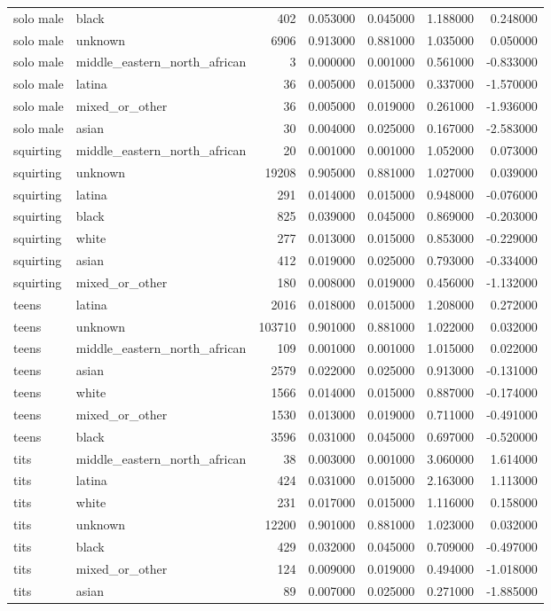 \begin{tabular}{llrrrrr}
solo male & black & 402 & 0.053000 & 0.045000 & 1.188000 & 0.248000 \\
solo male & unknown & 6906 & 0.913000 & 0.881000 & 1.035000 & 0.050000 \\
solo male & middle_eastern_north_african & 3 & 0.000000 & 0.001000 & 0.561000 & -0.833000 \\
solo male & latina & 36 & 0.005000 & 0.015000 & 0.337000 & -1.570000 \\
solo male & mixed_or_other & 36 & 0.005000 & 0.019000 & 0.261000 & -1.936000 \\
solo male & asian & 30 & 0.004000 & 0.025000 & 0.167000 & -2.583000 \\
squirting & middle_eastern_north_african & 20 & 0.001000 & 0.001000 & 1.052000 & 0.073000 \\
squirting & unknown & 19208 & 0.905000 & 0.881000 & 1.027000 & 0.039000 \\
squirting & latina & 291 & 0.014000 & 0.015000 & 0.948000 & -0.076000 \\
squirting & black & 825 & 0.039000 & 0.045000 & 0.869000 & -0.203000 \\
squirting & white & 277 & 0.013000 & 0.015000 & 0.853000 & -0.229000 \\
squirting & asian & 412 & 0.019000 & 0.025000 & 0.793000 & -0.334000 \\
squirting & mixed_or_other & 180 & 0.008000 & 0.019000 & 0.456000 & -1.132000 \\
teens & latina & 2016 & 0.018000 & 0.015000 & 1.208000 & 0.272000 \\
teens & unknown & 103710 & 0.901000 & 0.881000 & 1.022000 & 0.032000 \\
teens & middle_eastern_north_african & 109 & 0.001000 & 0.001000 & 1.015000 & 0.022000 \\
teens & asian & 2579 & 0.022000 & 0.025000 & 0.913000 & -0.131000 \\
teens & white & 1566 & 0.014000 & 0.015000 & 0.887000 & -0.174000 \\
teens & mixed_or_other & 1530 & 0.013000 & 0.019000 & 0.711000 & -0.491000 \\
teens & black & 3596 & 0.031000 & 0.045000 & 0.697000 & -0.520000 \\
tits & middle_eastern_north_african & 38 & 0.003000 & 0.001000 & 3.060000 & 1.614000 \\
tits & latina & 424 & 0.031000 & 0.015000 & 2.163000 & 1.113000 \\
tits & white & 231 & 0.017000 & 0.015000 & 1.116000 & 0.158000 \\
tits & unknown & 12200 & 0.901000 & 0.881000 & 1.023000 & 0.032000 \\
tits & black & 429 & 0.032000 & 0.045000 & 0.709000 & -0.497000 \\
tits & mixed_or_other & 124 & 0.009000 & 0.019000 & 0.494000 & -1.018000 \\
tits & asian & 89 & 0.007000 & 0.025000 & 0.271000 & -1.885000 \\
\bottomrule
\end{tabular}
